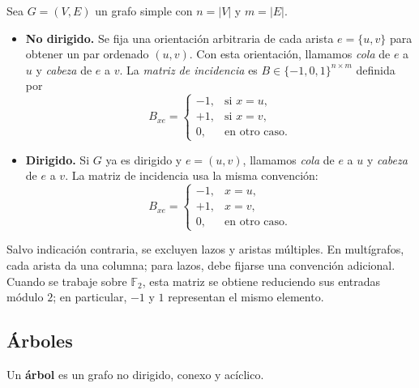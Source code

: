             \begin{definicion}
                Sea $G=(V,E)$ un grafo simple con $n=|V|$ y $m=|E|$.
                \begin{itemize}
                    \item \textbf{No dirigido.} Se fija una orientación arbitraria de cada arista $e=\{u,v\}$ para obtener un par ordenado $(u,v)$. Con esta orientación, llamamos \emph{cola} de $e$ a $u$ y \emph{cabeza} de $e$ a $v$. La \emph{matriz de incidencia} es $B\in\{-1,0,1\}^{n\times m}$ definida por
                    \[
                    B_{xe}=\begin{cases}
                        -1, & \text{si } x=u,\\
                        +1, & \text{si } x=v,\\
                        0,  & \text{en otro caso.}
                    \end{cases}
                    \]
                    \item \textbf{Dirigido.} Si $G$ ya es dirigido y $e=(u,v)$, llamamos \emph{cola} de $e$ a $u$ y \emph{cabeza} de $e$ a $v$. La matriz de incidencia usa la misma convención:
                    \[
                    B_{xe}=\begin{cases}
                        -1, & x=u,\\
                        +1, & x=v,\\
                        0,  & \text{en otro caso.}
                    \end{cases}
                    \]
                \end{itemize}
                Salvo indicación contraria, se excluyen lazos y aristas múltiples. En multígrafos, cada arista da una columna; para lazos, debe fijarse una convención adicional. Cuando se trabaje sobre $\mathbb{F}_2$, esta matriz se obtiene reduciendo sus entradas módulo $2$; en particular, $-1$ y $1$ representan el mismo elemento.
            \end{definicion}

        \subsection{Árboles}

            \begin{definicion}[Árbol]
                Un \textbf{árbol} es un grafo no dirigido, conexo y acíclico.
            \end{definicion}

